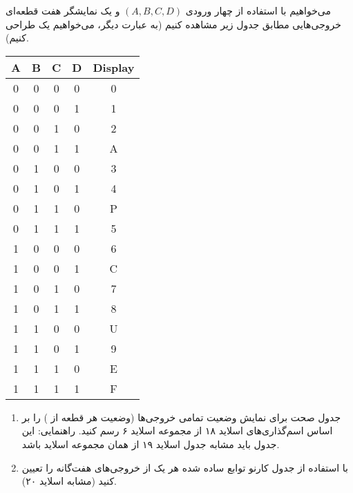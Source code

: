 می‌خواهیم با استفاده از چهار ورودی \((A, B, C, D)\) و یک نمایشگر هفت قطعه‌ای  خروجی‌هایی مطابق جدول زیر مشاهده کنیم (به عبارت دیگر، می‌خواهیم یک  طراحی کنیم).



\begin{latin}
	\begin{center}
		\begin{tabular}{|c|c|c|c|c|}
			\hline
			\textbf{A} & \textbf{B} & \textbf{C} & \textbf{D} & \textbf{Display} \\
			\hline
			0 & 0 & 0 & 0 & 0 \\
			0 & 0 & 0 & 1 & 1 \\
			0 & 0 & 1 & 0 & 2 \\
			0 & 0 & 1 & 1 & A \\
			0 & 1 & 0 & 0 & 3 \\
			0 & 1 & 0 & 1 & 4 \\
			0 & 1 & 1 & 0 & P \\
			0 & 1 & 1 & 1 & 5 \\
			1 & 0 & 0 & 0 & 6 \\
			1 & 0 & 0 & 1 & C \\
			1 & 0 & 1 & 0 & 7 \\
			1 & 0 & 1 & 1 & 8 \\
			1 & 1 & 0 & 0 & U \\
			1 & 1 & 0 & 1 & 9 \\
			1 & 1 & 1 & 0 & E \\
			1 & 1 & 1 & 1 & F \\
			\hline
		\end{tabular}
	\end{center}
\end{latin}


\begin{enumerate}
	\item 
	جدول صحت برای نمایش وضعیت تمامی خروجی‌ها (وضعیت هر قطعه از ) را بر اساس اسم‌گذاری‌های اسلاید ۱۸ از مجموعه اسلاید ۶ رسم کنید. راهنمایی: این جدول باید مشابه جدول اسلاید ۱۹ از همان مجموعه اسلاید باشد.
	
	\item 
	با استفاده از جدول کارنو توابع ساده شده هر یک از خروجی‌های هفت‌گانه را تعیین کنید (مشابه اسلاید ۲۰).
\end{enumerate}




